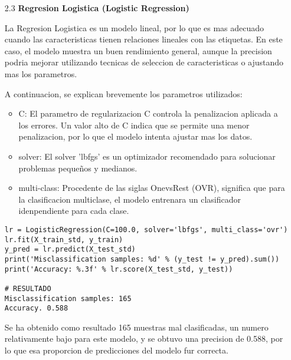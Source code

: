 \documentclass{article}
\begin{document}
\bigskip

\begin{itemize}

\item[2.3]  {\bf Regresion Logistica (Logistic Regression)}

La Regresion Logistica es un modelo lineal, por lo que es mas adecuado cuando las caracteristicas tienen relaciones lineales con las etiquetas. En este caso, el modelo muestra un buen rendimiento general, aunque la precision podria mejorar utilizando tecnicas de seleccion de caracteristicas o ajustando mas los parametros.

A continuacion, se explican brevemente los parametros utilizados:

\begin{itemize}

\item
C: El parametro de regularizacion C controla la penalizacion aplicada a los errores. Un valor alto de C indica que se permite una menor penalizacion, por lo que el modelo intenta ajustar mas los datos.

\item
solver: El solver 'lbfgs' es un optimizador recomendado para solucionar problemas pequeños y medianos.

\item
multi-class: Procedente de las siglas OnevsRest (OVR), significa que para la
clasificacion multiclase, el modelo entrenara un clasificador idenpendiente para cada 
clase.

\end{itemize}

\begin{tcolorbox}[width=14cm]
\begin{scriptsize}
\begin{verbatim}
lr = LogisticRegression(C=100.0, solver='lbfgs', multi_class='ovr')
lr.fit(X_train_std, y_train)
y_pred = lr.predict(X_test_std)
print('Misclassification samples: %d' % (y_test != y_pred).sum())
print('Accuracy: %.3f' % lr.score(X_test_std, y_test))

# RESULTADO
Misclassification samples: 165
Accuracy. 0.588
\end{verbatim}
\end{scriptsize}
\end{tcolorbox}

Se ha obtenido como resultado 165 muestras mal clasificadas, un numero relativamente bajo para este modelo, y se obtuvo una precision de 0.588, por lo que esa proporcion de  predicciones del modelo fur correcta.

\end{itemize}
\end{document}
